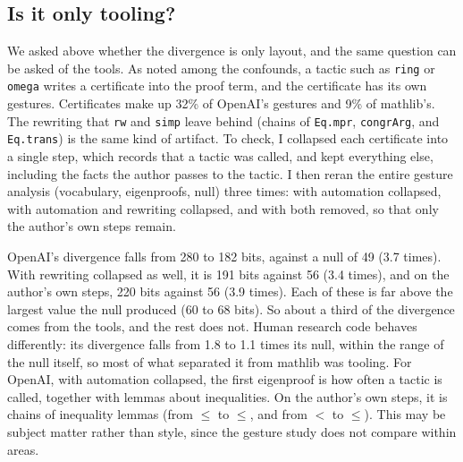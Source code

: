 \documentclass{article}
\begin{document}
\subsection{Is it only tooling?}

We asked above whether the divergence is only layout, and the same question can be asked of the tools. As noted among the confounds, a tactic such as \texttt{ring} or
\texttt{omega} writes a certificate into the proof term, and the certificate has its own gestures. Certificates make up
32\% of OpenAI's gestures and 9\% of mathlib's. The rewriting that \texttt{rw} and \texttt{simp} leave behind (chains of
\texttt{Eq.mpr}, \texttt{congrArg}, and \texttt{Eq.trans}) is the same kind of artifact. To check, I collapsed each
certificate into a single step, which records that a tactic was called, and kept everything else, including the facts
the author passes to the tactic. I then reran the entire gesture analysis (vocabulary, eigenproofs, null) three times:
with automation collapsed, with automation and rewriting collapsed, and with both removed, so that only the author's own
steps remain.

OpenAI's divergence falls from 280 to 182 bits, against a null of 49 (3.7 times). With rewriting collapsed as well, it
is 191 bits against 56 (3.4 times), and on the author's own steps, 220 bits against 56 (3.9 times). Each of these is
far above the largest value the null produced (60 to 68 bits). So about a third of the divergence comes from the tools,
and the rest does not. Human research code behaves differently: its divergence falls from 1.8 to 1.1 times its null,
within the range of the null itself, so most of what separated it from mathlib was tooling. For OpenAI,
with automation collapsed, the first eigenproof is how often a tactic is called, together with lemmas about
inequalities. On the author's own steps, it is chains of inequality lemmas (from $\leq$ to $\leq$, and from $<$ to
$\leq$). This may be subject matter rather than style, since the gesture study does not compare within areas.
\end{document}
